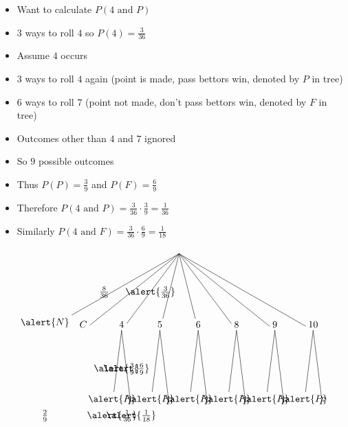 \documentclass[handout]{beamer}
\theoremstyle{definition}
\begin{document}
\begin{frame}
\begin{itemize}
\item Want to calculate $P\left(\text{$4$ and $P$}\right)$
\item $3$ ways to roll $4$ so $P\left(4\right)=\frac{3}{36}$
\item Assume $4$ occurs
\item $3$ ways to roll $4$ again (point is made, pass
bettors win, denoted by \alert{$P$} in tree)
\item $6$ ways to roll $7$ (point not made, don't pass
bettors win, denoted by \alert{$F$} in tree)
\item Outcomes other than $4$ and $7$ ignored
\item So $9$ possible outcomes
\item Thus $P\left(P\right)=\frac{3}{9}$
and $P\left(F\right)=\frac{6}{9}$
\item Therefore
$P\left(\text{$4$ and $P$}\right)
=\frac{3}{36}\cdot\frac{3}{9}=\frac{1}{36}$
\item Similarly $P\left(\text{$4$ and $F$}\right)
=\frac{3}{36}\cdot\frac{6}{9}=\frac{1}{18}$
\end{itemize}
\end{frame}

\begin{frame}
\[\begin{xy}<1.4cm,0cm>:
(4.5,0)="0";
(1,-2)="N";(2,-2)="C";(3,-2)="4";(4,-2)="5";
(5,-2)="6";(6,-2)="8";(7,-2)="9";(8,-2)="10";
"0";"N"*+!D{\alert{N}}**\dir{-}?*+!R{\frac{8}{36}};
"0";"C"*+!D{C}**\dir{-};
"0";"4"*+!D{4}**\dir{-}?*{\alert{\frac{3}{36}}};
"0";"5"*+!D{5}**\dir{-};
"0";"6"*+!D{6}**\dir{-};
"0";"8"*+!D{8}**\dir{-};
"0";"9"*+!D{9}**\dir{-};
"0";"10"*+!D{10}**\dir{-};
"4";(2.75,-4)*+!D{\alert{P}}**\dir{-}?*{\alert{\frac{3}{9}}};
"4";(3.25,-4)*+!D{F}**\dir{-}?*{\alert{\frac{6}{9}}};
"5";(3.75,-4)*+!D{\alert{P}}**\dir{-};
"5";(4.25,-4)*+!D{F}**\dir{-};
"6";(4.75,-4)*+!D{\alert{P}}**\dir{-};
"6";(5.25,-4)*+!D{F}**\dir{-};
"8";(5.75,-4)*+!D{\alert{P}}**\dir{-};
"8";(6.25,-4)*+!D{F}**\dir{-};
"9";(6.75,-4)*+!D{\alert{P}}**\dir{-};
"9";(7.25,-4)*+!D{F}**\dir{-};
"10";(7.75,-4)*+!D{\alert{P}}**\dir{-};
"10";(8.25,-4)*+!D{F}**\dir{-};
(1,-4)*+!U{\frac{2}{9}};
(2.75,-4)*+!U{\alert{\frac{1}{36}}};
(3.25,-4)*+!U{\alert{\frac{1}{18}}};
\end{xy}\]
\end{frame}
\end{document}
